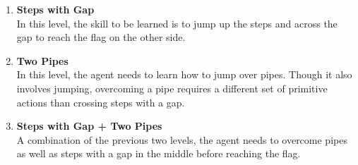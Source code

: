 \documentclass[notitlepage,a4paper,11pt]{article}
\begin{document}
\begin{enumerate}
	\item \textbf{Steps with Gap}\\
	In this level, the skill to be learned is to jump up the steps and across the gap to reach the flag on the other side.
	
	
	\item \textbf{Two Pipes}\\
	In this level, the agent needs to learn how to jump over pipes. Though it also involves jumping, overcoming a pipe requires a different set of primitive actions than crossing steps with a gap.
	
	\item \textbf{Steps with Gap + Two Pipes}\\
	A combination of the previous two levels, the agent needs to overcome pipes as well as steps with a gap in the middle before reaching the flag.
\end{enumerate}
\end{document}
